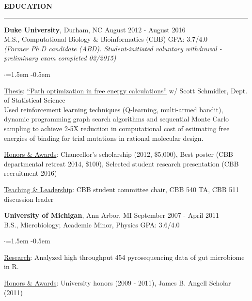 \documentclass[11pt]{article}
\newenvironment{rSection}[1]{ %
  \sectionskip
  \MakeUppercase{\bf #1} %
  \sectionlineskip
  \hrule %
  \begin{list}{}{ %
    \setlength{\leftmargin}{1.5em} %
  }
  \item[]
}{
  \end{list}
}
\def\sectionlineskip{\smallskip} %
\def\sectionskip{\smallskip} %
\begin{document}
\begin{rSection}{Education}

{\bf Duke University}, Durham, NC \hfill August 2012 - August 2016 \\
M.S., Computational Biology \& Bioinformatics (CBB) \hfill GPA: 3.7/4.0 \\
{\em {\small (Former Ph.D candidate (ABD). Student-initiated voluntary withdrawal - preliminary exam completed 02/2015)}}
\begin{list}{$\cdot$}{\leftmargin=1.5em} %
   \itemsep -0.5em \vspace{-0.5em} %
   \item \underline{Thesis}: \href{https://dl.dropboxusercontent.com/u/42186570/RM_thesis.pdf}{``Path optimization in free energy calculations''} {\small w/ Scott Schmidler, Dept. of Statistical Science} \\ 
   Used reinforcement learning techniques (Q-learning, multi-armed bandit), dynamic programming graph search algorithms and sequential Monte Carlo sampling to achieve 2-5X reduction in computational cost of estimating free energies of binding for trial mutations in rational molecular design. %
   \item \underline{Honors \& Awards}: Chancellor's scholarship (2012, \$5,000), Best poster (CBB departmental retreat 2014, \$100), Selected student research presentation (CBB recruitment 2016)
   \item \underline{Teaching \& Leadership}: CBB student committee chair, CBB 540 TA, CBB 511 discussion leader
\end{list}

\vspace{-0.0ex}
{\bf University of Michigan}, Ann Arbor, MI \hfill September 2007 - April 2011 \\ 
B.S., Microbiology; Academic Minor, Physics \hfill GPA: 3.6/4.0
\begin{list}{$\cdot$}{\leftmargin=1.5em} 
   \itemsep -0.5em \vspace{-0.5em} 
   \item \underline{Research}: Analyzed high throughput 454 pyrosequencing data of gut microbiome in R.
   \item \underline{Honors \& Awards}: University honors (2009 - 2011), James B. Angell Scholar (2011)
\end{list}


\end{rSection}
\end{document}
